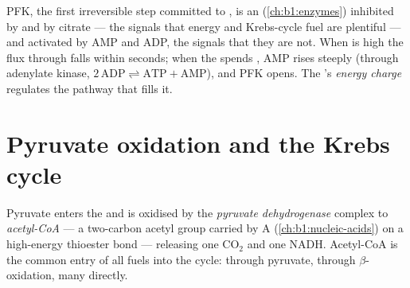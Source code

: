 \begin{proposition}\label{prop:b1:respiration-fermentation:pfk}
PFK, the first irreversible step committed to , is an
 (\cref{ch:b1:enzymes}) inhibited by  and by
citrate --- the signals that energy and Krebs-cycle fuel are plentiful
--- and activated by AMP and ADP, the signals that they are not. When
 is high the flux through  falls within seconds; when the
 spends , AMP rises steeply (through adenylate kinase,
$2\,\mathrm{ADP} \rightleftharpoons \mathrm{ATP} + \mathrm{AMP}$), and
PFK opens. The 's \emph{energy charge} regulates the pathway that
fills it.
\end{proposition}

\section{Pyruvate oxidation and the Krebs cycle}

\begin{definition}\label{def:b1:respiration-fermentation:pdh}
Pyruvate enters the  and is oxidised by the \emph{pyruvate
dehydrogenase} complex to \emph{acetyl-CoA} ---
a two-carbon acetyl group carried by  A (\cref{ch:b1:nucleic-acids})
on a high-energy thioester bond --- releasing one $\mathrm{CO_2}$ and
one NADH. Acetyl-CoA is the common entry of all fuels into the cycle:
 through pyruvate,  through $\beta$-oxidation, many
 directly.
\end{definition}

